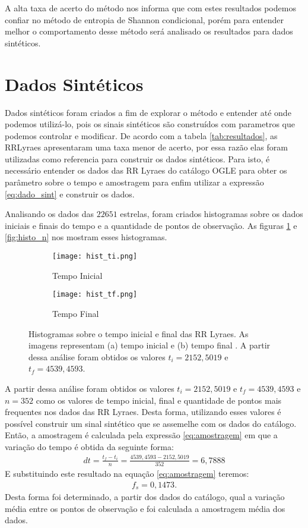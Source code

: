 A alta taxa de acerto do método nos informa que
com estes resultados podemos confiar no método de entropia de Shannon condicional, porém para entender melhor o comportamento desse método será analisado os resultados para dados sintéticos.

\section{Dados Sintéticos}

Dados sintéticos foram criados a fim de explorar o método e entender até onde podemos utilizá-lo, pois os sinais sintéticos são construídos com parametros que podemos controlar e modificar. De acordo com a tabela \ref{tab:resultados}, as RRLyraes apresentaram uma taxa menor de acerto, por essa razão elas foram utilizadas como referencia para construir os dados sintéticos. Para isto, é necessário entender os dados das RR Lyraes do catálogo OGLE para obter os parâmetro sobre o tempo e amostragem para enfim utilizar a expressão \ref{eq:dado_sint} e construir os dados.

Analisando os dados das $22651$ estrelas, foram criados histogramas sobre os dados iniciais e finais do tempo e a quantidade de pontos de observação. As figuras \ref{fig:hist} e \ref{fig:histo_n} nos mostram esses histogramas.

\begin{figure}[!h]
\centering
\begin{subfigure}{.5\textwidth}
  \centering
  \texttt{[image: hist\_ti.png]}
  \caption{Tempo Inicial}
\end{subfigure}%
\begin{subfigure}{.5\textwidth}
  \centering
  \texttt{[image: hist\_tf.png]}
  \caption{Tempo Final}
\end{subfigure}
\caption[Histogramas sobre tempo inicial e final.]{Histogramas sobre o tempo inicial e final das RR Lyraes. As imagens representam (a) tempo inicial e (b) tempo final . A partir dessa análise foram obtidos os valores $t_i = 2152,5019$ e $t_f = 4539,4593$.}
\label{fig:hist}
\end{figure}

A partir dessa análise foram obtidos os valores $t_i = 2152,5019$ e $t_f = 4539,4593$ e $n = 352$ como os valores de tempo inicial, final e quantidade de pontos mais frequentes nos dados das RR Lyraes. Desta forma, utilizando esses valores é possível construir um sinal sintético que se assemelhe com os dados do catálogo. Então, a amostragem é calculada pela expressão \ref{eq:amostragem} em que a variação do tempo é obtida da seguinte forma:
\begin{align}
dt = \frac{t_f - t_i}{n} = \frac{4539,4593 - 2152,5019}{352} = 6,7888
\end{align}
E substituindo este resultado na equação \ref{eq:amostragem} teremos:
\begin{align}
f_s = 0,1473 .
\end{align}
Desta forma foi determinado, a partir dos dados do catálogo, qual a variação média entre os pontos de observação e foi calculada a amostragem média dos dados.

